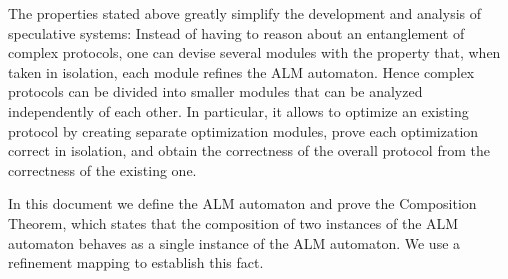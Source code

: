 The properties  stated  above greatly simplify the development and analysis of speculative systems: 
Instead of having to reason about an entanglement of complex protocols, one can devise several modules
with the property  that, when taken in isolation, each module refines
the  ALM automaton.  
Hence complex  protocols can be  divided into  smaller modules
that  can be  analyzed independently of each other.  In  particular, it allows  to
optimize  an existing  protocol  by creating  separate  optimization
modules, prove each optimization correct in isolation, and
obtain the correctness of the overall protocol from the correctness of the existing one.

In this document we define the ALM automaton and prove the Composition
Theorem, which states that the composition of two instances of the ALM
automaton behaves as a single instance  of the ALM automaton. We use a
refinement mapping to establish this fact.


